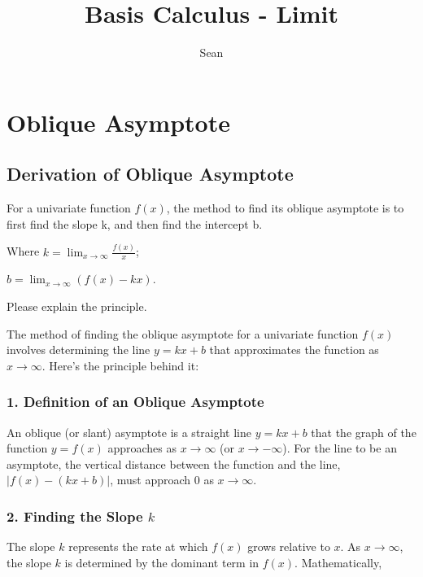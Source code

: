 \documentclass[a4paper,12pt]{article}
\begin{document}
	
\title{Basis Calculus - Limit}
\author{Sean}

\maketitle

\tableofcontents

\newpage

\section{Oblique Asymptote}

\subsection{Derivation of Oblique Asymptote}

\begin{qbox}
For a univariate function \(f(x)\), the method to find its oblique asymptote is to first find the slope k, and then find the intercept b.

Where \( k=\lim_{x\to \infty} \frac{f(x)}{x} \);

\( b=\lim_{x\to \infty} (f(x)-kx) \).

Please explain the principle.
\end{qbox}

The method of finding the oblique asymptote for a univariate function \( f(x) \) involves determining the line \( y = kx + b \) that approximates the function as \( x \to \infty \). Here's the principle behind it:

\subsubsection{1. Definition of an Oblique Asymptote}

An oblique (or slant) asymptote is a straight line \( y = kx + b \) that the graph of the function \( y = f(x) \) approaches as \( x \to \infty \) (or \( x \to -\infty \)). For the line to be an asymptote, the vertical distance between the function and the line, \( |f(x) - (kx + b)| \), must approach 0 as \( x \to \infty \).

\subsubsection{2. Finding the Slope \( k \)}

The slope \( k \) represents the rate at which \( f(x) \) grows relative to \( x \). As \( x \to \infty \), the slope \( k \) is determined by the dominant term in \( f(x) \). Mathematically,
\end{document}
